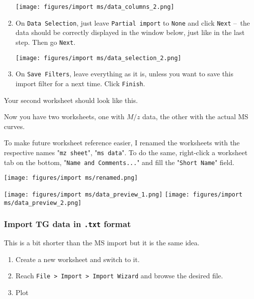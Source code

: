 \documentclass[a4paper, 11pt, raggedright, parskip]{tufte-style-article}
\begin{document}
\begin{enumerate}
\texttt{[image: figures/import ms/data\_columns\_2.png]}

\item On \texttt{Data Selection}, just leave \texttt{Partial import} to \texttt{None} and click \texttt{Next} --~the data should be correctly displayed in the window below, just like in the last step. Then go \texttt{Next}.

\texttt{[image: figures/import ms/data\_selection\_2.png]}

\item On \texttt{Save Filters}, leave everything as it is, unless you want to save this import filter for a next time. Click \texttt{Finish}.

\end{enumerate}

Your second worksheet should look like this.

Now you have two worksheets, one with $M/z$ data, the other with the actual MS curves.

To make future worksheet reference easier, I renamed the worksheets with the respective names "\texttt{mz sheet}", "\texttt{ms data}". To do the same, right-click a worksheet tab on the bottom, "\texttt{Name and Comments...}" and fill the "\texttt{Short Name}" field.

\texttt{[image: figures/import ms/renamed.png]}

\smallskip

\begin{wide}
\texttt{[image: figures/import ms/data\_preview\_1.png]}
\hfill
\texttt{[image: figures/import ms/data\_preview\_2.png]}
\end{wide}

\subsubsection{Import TG data in \texttt{.txt} format}
\label{subsubsec:import_tg}

This is a bit shorter than the MS import but it is the same idea.

\begin{enumerate}

\item Create a new worksheet and switch to it.

\item Reach \texttt{File > Import > Import Wizard} and browse the desired file.

\item Plot 

\end{enumerate}	
\end{document}
